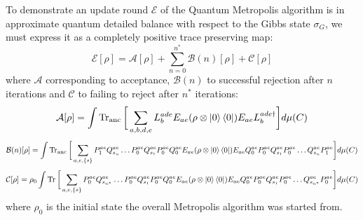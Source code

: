 \documentclass[aps,floatfix,10pt,amssymb,amsfont,amsmath,superscriptaddress,float,nofootinbib,longbibliography,nobalancelastpage,twocolumn]{revtex4-2}
\newtheorem{corollary}{Corollary}
\begin{document}
\begin{widetext}
To demonstrate an update round $\mathcal{E}$ of the Quantum Metropolis algorithm is in approximate quantum detailed balance with respect to the Gibbs state $\sigma_G$, we must express it as a completely positive trace preserving map:
\begin{equation}
    \mathcal{E}[\rho] = \mathcal{A}[\rho] + \sum_{n=0}^{n^*} \mathcal{B}(n)[\rho] + \mathcal{C}[\rho]
\end{equation}
where $\mathcal{A}$ corresponding to acceptance, $\mathcal{B}(n)$ to successful rejection after $n$ iterations and $\mathcal{C}$ to failing to reject after $n^*$ iterations:
\begin{equation}
    \mathcal{A}[\rho] = \int  \operatorname{Tr}_{\mathrm{anc}}\bigg[\sum_{a,b,d,e}L_b^{ade} E_{ae} ( \rho\otimes \ket{0}\bra{0}) 
     E_{ae}L^{ade\dagger}_b\bigg]d\mu(C)
\end{equation}
\begin{equation}
    \mathcal{B}(n)[\rho] = \int \operatorname{Tr}_{\mathrm{anc}}\bigg[\sum_{a,e,\{s\}}P^{ae}_1Q^{ae}_{s_n}\ldots P^{ae}_0Q^{ae}_{s_1}P^{ae}_0Q^{ae}_0E_{ae} ( \rho\otimes \ket{0}\bra{0})E_{ae}Q^{ae}_0P^{ae}_0Q^{ae}_{s_1}P^{ae}_0\ldots Q^{ae}_{s_n}P^{ae}_1\bigg]d\mu(C)
\end{equation}
\begin{equation}
    \mathcal{C}[\rho] = \rho_0 \int \operatorname{Tr}\bigg[\sum_{a,e,\{s\}}P^{ae}_0Q^{ae}_{s_{n^*}}\ldots P^{ae}_0Q^{ae}_{s_1}P^{ae}_0Q^{ae}_0E_{ae} ( \rho\otimes \ket{0}\bra{0})E_{ae}Q^{ae}_0P^{ae}_0Q^{ae}_{s_1}P^{ae}_0\ldots Q^{ae}_{s_{n^*}}P^{ae}_0\bigg]d\mu(C) 
\end{equation}
where $\rho_0$ is the initial state the overall Metropolis algorithm was started from. 



\end{widetext}
\end{document}
